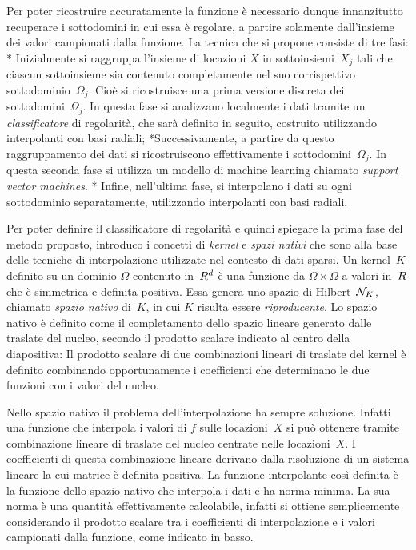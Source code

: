 Per poter ricostruire accuratamente la funzione è necessario dunque innanzitutto  recuperare i sottodomini in cui essa è regolare, a partire solamente dall'insieme dei valori campionati dalla funzione.  La tecnica che si propone consiste di tre fasi:
\begitems
* Inizialmente si raggruppa l'insieme di locazioni $X$ in sottoinsiemi~$X_j$ tali che ciascun sottoinsieme sia contenuto completamente nel suo corrispettivo sottodominio~$\Omega_j$.  Cioè si ricostruisce una prima versione discreta dei sottodomini~$\Omega_j$.   In questa fase si analizzano localmente i dati tramite un {\em classificatore} di regolarità, che sarà definito in seguito, costruito utilizzando interpolanti con basi radiali;
*Successivamente, a partire da questo raggruppamento dei dati si ricostruiscono effettivamente i sottodomini~$\Omega_j$.  In questa seconda fase si utilizza un modello di machine learning chiamato {\em support vector machines}.
* Infine, nell'ultima fase, si interpolano i dati su ogni sottodominio separatamente, utilizzando interpolanti con basi radiali.
\enditems


Per poter definire il classificatore di regolarità e quindi spiegare la prima fase del metodo proposto, introduco i concetti di {\em kernel} e {\em spazi nativi} che sono alla base delle tecniche di interpolazione utilizzate nel contesto di dati sparsi.
Un kernel~$K$ definito su un dominio $\Omega$ contenuto in~$R^d$ è una funzione da $\Omega{\times}\Omega$ a valori in~$R$ che è simmetrica e definita positiva.  Essa genera uno spazio di Hilbert~${\cal N}_K$, chiamato {\em spazio nativo} di~$K$, in cui $K$ risulta essere {\em riproducente}.
Lo spazio nativo è definito come il completamento dello spazio lineare generato dalle traslate del nucleo, secondo il prodotto scalare indicato al centro della diapositiva:  Il prodotto scalare di due combinazioni lineari di traslate del kernel è definito combinando opportunamente i coefficienti che determinano le due funzioni con i valori del nucleo.


Nello spazio nativo il problema dell'interpolazione ha sempre soluzione.  Infatti una funzione che interpola i valori di $f$ sulle locazioni~$X$ si può ottenere tramite combinazione lineare di traslate del nucleo centrate nelle locazioni~$X$.   I coefficienti di questa combinazione lineare derivano dalla risoluzione di un sistema lineare la cui matrice è definita positiva.
  La funzione interpolante così definita è la funzione dello spazio nativo che interpola i dati e ha norma minima.  
 La sua norma  è una quantità effettivamente calcolabile, infatti si ottiene semplicemente considerando il prodotto scalare tra i coefficienti di interpolazione e i valori campionati dalla funzione, come indicato in basso. 





